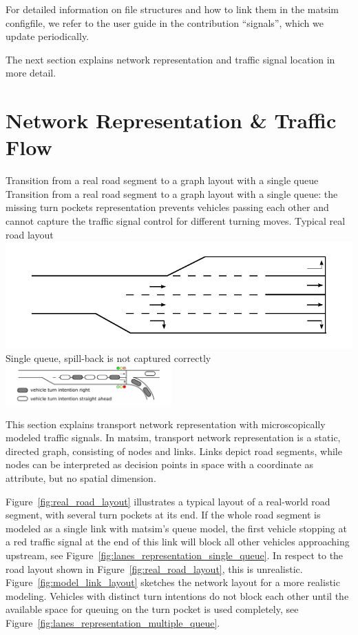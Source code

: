 For detailed information on file structures and how to link them in the \gls{matsim} \gls{configfile}, we refer to the user guide in the contribution ``signals'', which we update periodically.

The next section explains network representation and traffic signal location in more detail. 

\section{Network Representation \& Traffic Flow}
\label{sec:signals_network_traffic_flow}

\createfigure%
{Transition from a real road segment to a graph layout with a single queue}%
{Transition from a real road segment to a graph layout with a single queue: the missing turn pockets representation prevents vehicles passing each other and cannot capture the traffic signal control for different turning moves. }
{\label{fig:combined_model}}
{%
  \createsubfigure%
	{Typical real road layout}
	{\includegraphics[width=0.475\linewidth]{extending/figures/signalslanes/real_road_layout.pdf}}
	{\label{fig:real_road_layout}}
  \createsubfigure%
	{Single queue, spill-back is not captured correctly}%
	{\includegraphics[width=0.48\textwidth]{extending/figures/signalslanes/single_queue_model_inkscape.pdf}}%
	{\label{fig:lanes_representation_single_queue}}%
}%
{\citet{GretherNeumannNagel2012SignalsQueueModelABMTrans}}

This section explains transport network representation with microscopically modeled traffic signals. 
In \gls{matsim}, transport network representation is a static, directed graph, consisting of nodes and links. 
Links depict road segments, while nodes can be interpreted as decision points in space with a coordinate as attribute, but no spatial dimension. 

Figure~\ref{fig:real_road_layout} illustrates a typical layout of a real-world road segment, with several turn pockets at its end. 
If the whole road segment is modeled as a single link with \gls{matsim}'s queue model, the first vehicle stopping at a red traffic signal at the end of this link will block all other vehicles approaching upstream, see Figure~\ref{fig:lanes_representation_single_queue}. 
In respect to the road layout shown in Figure~\ref{fig:real_road_layout}, this is unrealistic. 
Figure~\ref{fig:model_link_layout} sketches the network layout for a more realistic modeling. 
Vehicles with distinct turn intentions do not block each other until the available space for queuing on the turn pocket is used completely, see Figure~\ref{fig:lanes_representation_multiple_queue}. 

